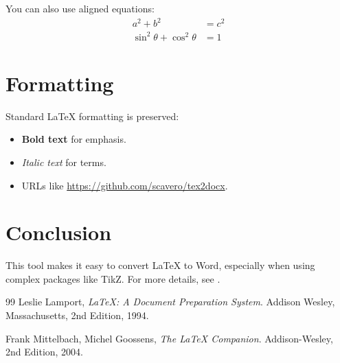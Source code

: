 \documentclass{article}
\begin{document}
You can also use aligned equations:
\begin{align}
  a^2 + b^2                     & = c^2 \\
  \sin^2 \theta + \cos^2 \theta & = 1
\end{align}

\section{Formatting}
Standard LaTeX formatting is preserved:
\begin{itemize}
  \item \textbf{Bold text} for emphasis.
  \item \textit{Italic text} for terms.
  \item URLs like \url{https://github.com/scavero/tex2docx}.
\end{itemize}

\section{Conclusion}
This tool makes it easy to convert LaTeX to Word, especially when using complex packages like TikZ. For more details, see \cite{lamport94}.

\newpage
\begin{thebibliography}{99}
  Leslie Lamport,
  \textit{\LaTeX: A Document Preparation System}.
  Addison Wesley, Massachusetts,
  2nd Edition,
  1994.

  Frank Mittelbach, Michel Goossens,
  \textit{The \LaTeX{} Companion}.
  Addison-Wesley,
  2nd Edition,
  2004.
\end{thebibliography}
\end{document}
